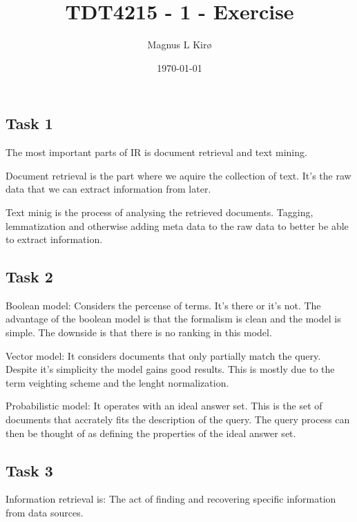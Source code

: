 \documentclass[12pt, a4paper]{article}
\title{TDT4215 - 1 - Exercise}
\author{
        Magnus L Kirø \\
}
\date{\today}
\begin{document}
\maketitle
{}

\subsection{Task 1}

The most important parts of  IR is document retrieval and text mining.

Document retrieval is the part where we aquire the collection of text.
It's the raw data that we can extract information from later.

Text minig is the process of analysing the retrieved documents.
Tagging, lemmatization and otherwise adding meta data to the raw data to better be able to extract information.

\subsection{Task 2}

Boolean model:
Considers the percense of terms. It's there or it's not. 
The advantage of the boolean model is that the formalism is clean and the model is simple. 
The downside is that there is no ranking in this model. 

Vector model:
It considers documents that only partially match the query. 
Despite it's simplicity the model gains good results. 
This is mostly due to the term veighting scheme and the lenght normalization. 

Probabilistic model:
It operates with an ideal answer set. This is the set of documents that accrately fits the description of the query. 
The query process can then be thought of as defining the properties of the ideal answer set. 

\subsection{Task 3}
Information retrieval is: The act of finding and recovering specific information from data sources. 
\end{document}
